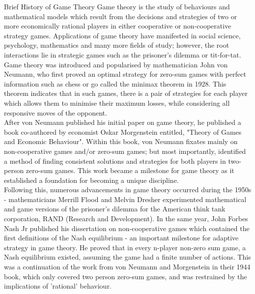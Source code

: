 \documentclass[12pt,a4paper]{article}
\makeatletter
\renewcommand\subsection{\@startsection {subsection}{1}{2mm}
                               {3pt plus 2pt minus 1pt}
                               {3pt plus 0pt}
                               {\normalfont\bfseries}}
\makeatother
\begin{document}
\subsection{Brief History of Game Theory}
Game theory is the study of behaviours and mathematical models which result from the decisions and strategies of two or more economically rational players in either cooperative or non-cooperative strategy games. Applications of game theory have manifested in social science, psychology, mathematics and many more fields of study; however, the root interactions lie in strategic games such as the prisoner's dilemma or tit-for-tat. Game theory was introduced and popularised by mathematician John von Neumann, who first proved an optimal strategy for zero-sum games with perfect information such as chess or go called the minimax theorem in 1928. This theorem indicates that in such games, there is a pair of strategies for each player which allows them to minimise their maximum losses, while considering all responsive moves of the opponent. \\
\noindent
After von Neumann published his initial paper on game theory, he published a book co-authored by economist Oskar Morgenstein entitled, "Theory of Games and Economic Behaviour". Within this book, von Neumann fixates mainly on non-cooperative games and/or zero-sum games; but most importantly, identified a method of finding consistent solutions and strategies for both players in two-person zero-sum games. This work became a milestone for game theory as it established a foundation for becoming a unique discipline. \\
\noindent
Following this, numerous advancements in game theory occurred during the 1950s - mathematicians Merrill Flood and Melvin Dresher experimented mathematical and game versions of the prisoner's dilemma for the American think tank corporation, RAND (Research and Development). In the same year, John Forbes Nash Jr published his dissertation on non-cooperative games which contained the first definitions of the Nash equilibrium - an important milestone for adaptive strategy in game theory. He proved that in every n-player non-zero sum game, a Nash equilibrium existed, assuming the game had a finite number of actions. This was a continuation of the work from von Neumann and Morgenstein in their 1944 book, which only covered two person zero-sum games, and was restrained by the implications of 'rational' behaviour. \\
\noindent
\end{document}
